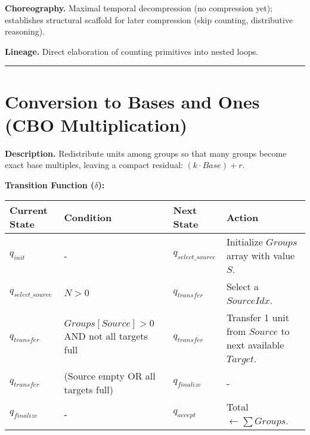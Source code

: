 \documentclass[
]{article}
\begin{document}
\textbf{Choreography.} Maximal temporal decompression (no compression
yet); establishes structural scaffold for later compression (skip
counting, distributive reasoning).

\textbf{Lineage.} Direct elaboration of counting primitives into nested
loops.

\begin{center}\rule{0.5\linewidth}{0.5pt}\end{center}

\section{Conversion to Bases and Ones (CBO
Multiplication)}\label{conversion-to-bases-and-ones-cbo-multiplication}

\textbf{Description.} Redistribute units among groups so that many
groups become exact base multiples, leaving a compact residual:
\((k \cdot Base) + r\).

\textbf{Transition Function (\(\delta\)):}

\begin{longtable}[]{@{}
  >{\raggedright\arraybackslash}p{}
  >{\raggedright\arraybackslash}p{}
  >{\raggedright\arraybackslash}p{}
  >{\raggedright\arraybackslash}p{}@{}}
\toprule\noalign{}
\begin{minipage}[b]{\linewidth}\raggedright
Current State
\end{minipage} & \begin{minipage}[b]{\linewidth}\raggedright
Condition
\end{minipage} & \begin{minipage}[b]{\linewidth}\raggedright
Next State
\end{minipage} & \begin{minipage}[b]{\linewidth}\raggedright
Action
\end{minipage} \\
\midrule\noalign{}
\endhead
\bottomrule\noalign{}
\endlastfoot
\(q_{init}\) & - & \(q_{select\_source}\) & Initialize \(Groups\) array
with value \(S\). \\
\(q_{select\_source}\) & \(N>0\) & \(q_{transfer}\) & Select a
\(SourceIdx\). \\
\(q_{transfer}\) & \(Groups[Source] > 0\) AND not all targets full &
\(q_{transfer}\) & Transfer 1 unit from \(Source\) to next available
\(Target\). \\
\(q_{transfer}\) & (Source empty OR all targets full) & \(q_{finalize}\)
& - \\
\(q_{finalize}\) & - & \(q_{accept}\) & Total
\(\leftarrow \sum Groups\). \\
\end{longtable}
\end{document}
